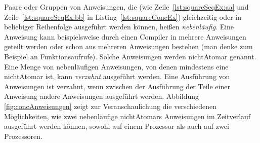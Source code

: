Paare oder Gruppen von Anweisungen, die (wie Zeile~\ref{lst:squareSeqEx:aa} und Zeile~\ref{lst:squareSeqEx:bb} in Listing~\vref{lst:squareConcEx}) gleichzeitig oder in beliebiger Reihenfolge ausgeführt werden können, heißen \emph{nebenläufig}. Eine Anweisung kann beispielsweise durch einen Compiler in mehrere Anweisungen geteilt werden oder schon aus mehreren Anweisungen bestehen (man denke zum Beispiel an Funktionsaufrufe). Solche Anweisungen werden \gls{nichtAtomar} genannt. Eine Menge von nebenläufigen Anweisungen, von denen mindestens eine \gls{nichtAtomar} ist, kann \emph{verzahnt} ausgeführt werden. Eine Ausführung von Anweisungen ist verzahnt, wenn zwischen der Ausführung der Teile einer  Anweisung andere Anweisungen ausgeführt werden. Abbildung \vref{fig:concAnweisungen} zeigt zur Veranschaulichung die verschiedenen Möglichkeiten, wie zwei nebenläufige \glspl{nichtAtomar} Anweisungen im Zeitverlauf ausgeführt werden können, sowohl auf einem Prozessor als auch auf zwei Prozessoren. 
